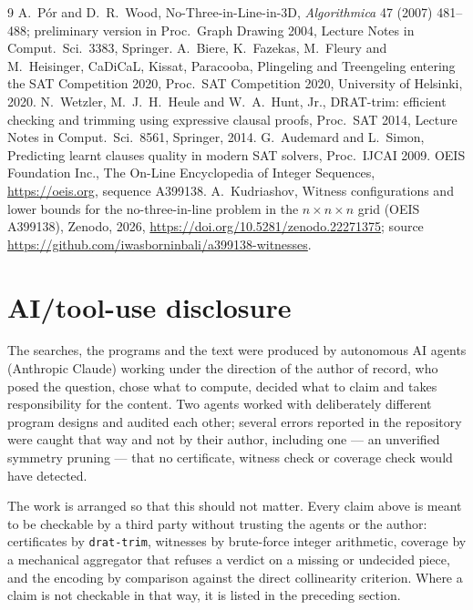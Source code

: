 \documentclass[11pt,a4paper]{article}
\begin{document}
\begin{thebibliography}{9}
 A.~P\'or and D.~R.~Wood, No-Three-in-Line-in-3D, \emph{Algorithmica} 47 (2007) 481--488;
preliminary version in Proc.\ Graph Drawing 2004, Lecture Notes in Comput.\ Sci.\ 3383, Springer.
 A.~Biere, K.~Fazekas, M.~Fleury and M.~Heisinger, CaDiCaL, Kissat, Paracooba, Plingeling and
Treengeling entering the SAT Competition 2020, Proc.\ SAT Competition 2020, University of Helsinki, 2020.
 N.~Wetzler, M.~J.~H.~Heule and W.~A.~Hunt, Jr., DRAT-trim: efficient checking and trimming
using expressive clausal proofs, Proc.\ SAT 2014, Lecture Notes in Comput.\ Sci.\ 8561, Springer, 2014.
 G.~Audemard and L.~Simon, Predicting learnt clauses quality in modern SAT solvers,
Proc.\ IJCAI 2009.
 OEIS Foundation Inc., The On-Line Encyclopedia of Integer Sequences, \url{https://oeis.org},
sequence A399138.
 A.~Kudriashov, Witness configurations and lower bounds for the no-three-in-line problem in the
$n\times n\times n$ grid (OEIS A399138), Zenodo, 2026, \url{https://doi.org/10.5281/zenodo.22271375}; source
\url{https://github.com/iwasborninbali/a399138-witnesses}.
\end{thebibliography}

\section*{AI/tool-use disclosure}
The searches, the programs and the text were produced by autonomous AI agents (Anthropic Claude) working under
the direction of the author of record, who posed the question, chose what to compute, decided what to claim and
takes responsibility for the content.  Two agents worked with deliberately different program designs and audited
each other; several errors reported in the repository were caught that way and not by their author, including
one --- an unverified symmetry pruning --- that no certificate, witness check or coverage check would have
detected.

The work is arranged so that this should not matter.  Every claim above is meant to be checkable by a third
party without trusting the agents or the author: certificates by \texttt{drat-trim}, witnesses by brute-force
integer arithmetic, coverage by a mechanical aggregator that refuses a verdict on a missing or undecided piece,
and the encoding by comparison against the direct collinearity criterion.  Where a claim is not checkable in
that way, it is listed in the preceding section.
\end{document}
